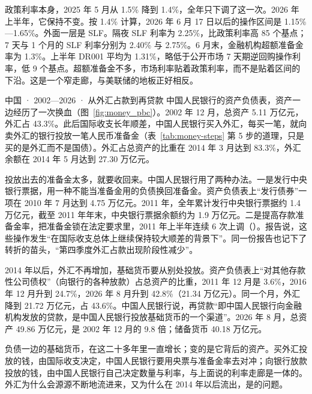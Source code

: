 政策利率本身，2025 年 5 月从 1.5\% 降到 1.4\%，全年只下调了这一次\cite{pbc2025q2,pbc2025q4}。2026 年上半年，它保持不变\cite{pbc2026q2}。按 1.4\% 计算，2026 年 6 月 17 日以后的操作区间是 1.15\%—1.65\%。外面一层是 SLF。隔夜 SLF 利率为 2.25\%，比政策利率高 85 个基点；7 天与 1 个月的 SLF 利率分别为 2.40\% 与 2.75\%。6 月末，金融机构超额准备金率为 1.3\%。上半年 DR001 平均为 1.31\%，略低于公开市场 7 天期逆回购操作利率，低 9 个基点\cite{pbc2026q2}。超额准备金不多，市场利率贴着政策利率，而不是贴着区间的下沿。这是一个窄走廊，与美联储的地板正好相反。

\begin{case}{中国 · 2002—2026 · 从外汇占款到再贷款}
中国人民银行的资产负债表，资产一边经历了一次换血（图~\ref{fig:money_pbc}）。2002 年 12 月，总资产 5.11 万亿元，外汇占 43.3\%\cite{pbc2026bs}。此后国际收支长年顺差，中国人民银行买入外汇，每买一笔，就向卖外汇的银行投放一笔人民币准备金（表~\ref{tab:money-steps} 第 5 步的道理，只是买的是外汇而不是国债）。外汇占总资产的比重在 2014 年 3 月达到 83.3\%，外汇余额在 2014 年 5 月达到 27.30 万亿元\cite{pbc2026bs}。

投放出去的准备金太多，就要收回来。中国人民银行用了两种办法。一是发行中央银行票据，用一种不能当准备金用的负债换回准备金。资产负债表上“发行债券”一项在 2010 年 7 月达到 4.75 万亿元\cite{pbc2026bs}。2011 年，全年累计发行中央银行票据约 1.4 万亿元，截至 2011 年年末，中央银行票据余额约为 1.9 万亿元\cite{pbc2011q4}。二是提高存款准备金率，把准备金锁在法定要求里，2011 年上半年连续 6 次上调（）。报告说，这些操作发生“在国际收支总体上继续保持较大顺差的背景下”\cite{pbc2011q4}。同一份报告也记下了转折的苗头，“第四季度外汇占款出现阶段性减少”\cite{pbc2011q4}。

2014 年以后，外汇不再增加，基础货币要从别处投放。资产负债表上“对其他存款性公司债权”（向银行的各种放款）占总资产的比重，2011 年 12 月是 3.6\%，2016 年 12 月升到 24.7\%，2026 年 8 月升到 42.8\%（21.34 万亿元）。同一个月，外汇降到 21.72 万亿元，占 43.6\%\cite{pbc2026bs}。中国人民银行说，再贷款“即中国人民银行向金融机构发放的贷款，是中国人民银行投放基础货币的一个渠道”\cite{pbc2025q4}。2026 年 8 月，总资产 49.86 万亿元，是 2002 年 12 月的 9.8 倍；储备货币 40.18 万亿元\cite{pbc2026bs}。

负债一边的基础货币，在这二十多年里一直增长；变的是它背后的资产。买外汇投放的钱，由国际收支决定，中国人民银行要用央票与准备金率去对冲；向银行放款投放的钱，由中国人民银行自己决定数量与利率，与上面说的利率走廊是一体的。外汇为什么会源源不断地流进来，又为什么在 2014 年以后流出，是的问题。
\end{case}

